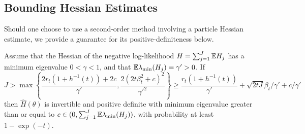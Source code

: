 \subsection{Bounding Hessian Estimates}

Should one choose to use a second-order method involving a particle Hessian estimate, we provide a guarantee for its positive-definiteness below.

\begin{lem}
    \label{lemma:hess_bound}
    Assume that the Hessian of the negative log-likelihood $H=\sum_{j=1}^J \mathbb{E} H_j$ has a minimum eigenvalue $0<\gamma<1$, and that $\mathbb{E} \lambda_{\min} (H_j) = \gamma' > 0$. 
    If 
    \begin{equation}
        J > \max\left\{\frac{2r_t(1+h^{-1}(t)) + 2c}{\gamma'}, \frac{2(2t\beta_t^2+c)^2}{\gamma'^2}\right\} \geq  \frac{r_t(1+h^{-1}(t))}{\gamma'} + \sqrt{2tJ}\beta_t/\gamma' + c/\gamma'
    \end{equation}    
    then $\hat{H}(\theta)$ is invertible and positive definite with minimum eigenvalue greater than or equal to $c \in (0, \sum_{j=1}^J \mathbb{E}\lambda_{\min}(H_j))$, with probability at least $1-\exp(-t)$.
\end{lem}
